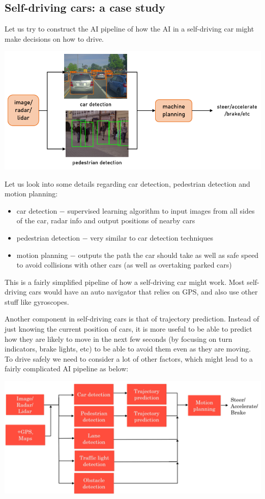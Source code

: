 \documentclass{article}[a4paper,12pt]
\theoremstyle{definition}
\begin{document}
\subsection{Self-driving cars: a case study}
Let us try to construct the AI pipeline of how the AI in a self-driving car might make decisions on how to drive.
\begin{center}\includegraphics[scale=0.8]{self_driving_car_steps.png}\end{center}
Let us look into some details regarding car detection, pedestrian detection and motion planning:
\begin{itemize}
	\item car detection $-$ supervised learning algorithm to input images from all sides of the car, radar info and output positions of nearby cars
	\item pedestrian detection $-$ very similar to car detection techniques
	\item motion planning $-$ outputs the path the car should take as well as safe speed to avoid collisions with other cars (as well as overtaking parked cars)
\end{itemize}
This is a fairly simplified pipeline of how a self-driving car might work. Most self-driving cars would have an auto navigator that relies on GPS, and also use other stuff like gyroscopes. 
\vspace{6pt}

Another component in self-driving cars is that of trajectory prediction. Instead of just knowing the current position of cars, it is more useful to be able to predict how they are likely to move in the next few seconds (by focusing on turn indicators, brake lights, etc) to be able to avoid them even as they are moving. To drive safely we need to consider a lot of other factors, which might lead to a fairly complicated AI pipeline as below:
\begin{center}
\includegraphics[width=\textwidth]{self_driving_pipeline.png}
\end{center}
\end{document}
